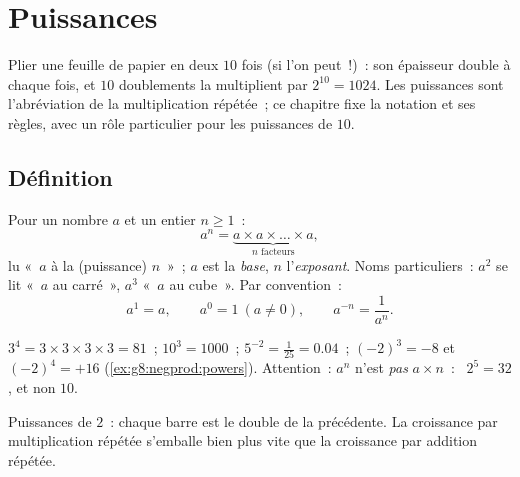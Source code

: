 \chapter{Puissances}\label{ch:g8:powers}

Plier une feuille de papier en deux $10$ fois (si l'on peut~!)~: son
épaisseur double à chaque fois, et $10$ doublements la multiplient par
$2^{10} = 1024$. Les puissances sont l'abréviation de la
multiplication répétée~; ce chapitre fixe la notation et ses règles,
avec un rôle particulier pour les puissances de $10$.

\section{Définition}

\begin{definition}[Puissance]\label{def:g8:powers:def}
Pour un nombre $a$ et un entier $n \geq 1$~:
\[
a^n = \underbrace{a \times a \times \dots \times a}_{n
\text{ facteurs}},
\]
lu «~$a$ à la (puissance) $n$~»~; $a$ est la \emph{base}, $n$
l'\emph{exposant}. Noms particuliers~: $a^2$ se lit
«~$a$ au carré~», $a^3$ «~$a$ au cube~». Par convention~:
\[
a^1 = a,
\qquad
a^0 = 1 \ (a \neq 0),
\qquad
a^{-n} = \frac{1}{a^n}.
\]
\end{definition}

\begin{example}\label{ex:g8:powers:def}
$3^4 = 3 \times 3 \times 3 \times 3 = 81$~; \quad
$10^3 = 1000$~; \quad $5^{-2} = \frac{1}{25} = 0.04$~; \quad
$(-2)^3 = -8$ et $(-2)^4 = +16$
(\cref{ex:g8:negprod:powers}). Attention~: $a^n$ n'est \emph{pas}
$a \times n$~: \ $2^5 = 32$, et non $10$.
\end{example}

\begin{omfigure}

{\small Puissances de $2$~: chaque barre est le double de la
précédente. La croissance par multiplication répétée s'emballe bien
plus vite que la croissance par addition répétée.}
\end{omfigure}

